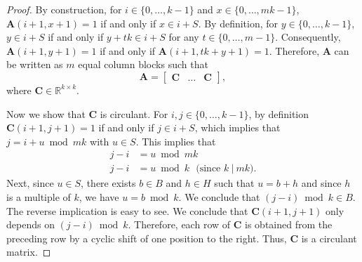 \documentclass[journal,draftcls,onecolumn]{IEEEtran}
\theoremstyle{mystyle}
\newcommand{\bfC}{\mathbf{C}}
\newcommand{\bfA}{\mathbf{A}}
\newcommand{\aditya}[1]{\marginpar{+}{\bf Aditya's remark}: {\em #1}}
\begin{document}
\begin{proof}
By construction, for $i \in \{0, \dots, k-1\}$ and $x \in \{0 , \dots, mk-1\}$, $\bfA(i+1, x+1) = 1$ if and only if $x \in i+ S$. By definition, for $y \in \{0, \dots, k-1\}$, $y \in i+S$ if and only if $y + tk \in i + S$ for any $t \in \{0, \dots, m-1\}$. Consequently, $\bfA(i+1, y+1) = 1$ if and only if $\bfA(i+1, tk + y+1) = 1$. Therefore, $\bfA$ can be written as $m$ equal column blocks such that 
\[ \bfA = \begin{bmatrix} \bfC & \dots & \bfC \end{bmatrix},\]
 where $\bfC \in \mathbb{R}^{k \times k}$. 

Now we show that $\bfC$ is circulant. For $i,j \in \{0, \dots, k-1\}$, by definition $\bfC(i+1, j+1) = 1$ if and only if $j \in i + S$, which implies that $j = i + u \bmod mk$ with $u \in S$. This implies that
\begin{align*}
    j-i &= u \bmod mk\\
    j-i &= u \bmod k \text{~~(since $k ~|~ mk$)}.
\end{align*}
Next, since $u \in S$, there exists $b \in B$ and $h \in H$ such that $u = b+h$ and since $h$ is a multiple of $k$, we have $u = b \bmod k$. We conclude that $(j-i) \bmod k \in B$. The reverse implication is easy to see. We conclude that $\bfC(i+1,j+1)$ only depends on $(j-i) \bmod k$. Therefore, each row of $\bfC$ is obtained from the preceding row by a cyclic shift of one position to the right. Thus, $\bfC$ is a circulant matrix.


\end{proof}
\end{document}
